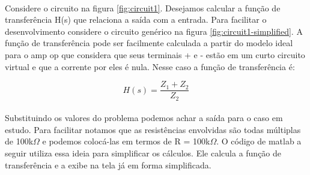 \documentclass[a4paper,11pt]{article}
\begin{document}
\paragraph{}Considere o circuito na figura \ref{fig:circuit1}. 
Desejamos calcular a função de transferência H(s) que relaciona
a saída com a entrada. Para facilitar o desenvolvimento considere
o circuito genérico na figura \ref{fig:circuit1-simplified}. 
A função de transferência pode ser facilmente calculada a partir
do modelo ideal para o amp op que considera que seus terminais
+ e - estão em um curto circuito virtual e que a corrente por 
eles é nula. Nesse caso a função de transferência é:

\begin{equation}
	H(s) = \frac{Z_1 + Z_2}{Z_2}
	\label{eq:exerc1-H}
\end{equation}
\paragraph{}Substituindo os valores do problema podemos achar 
a saída para o caso em estudo. Para facilitar notamos que as 
resistências envolvidas são todas múltiplas de 100k$\Omega$
e podemos colocá-las em termos de R = 100k$\Omega$. O código
de matlab a seguir utiliza essa ideia para simplificar os 
cálculos. Ele calcula a função de transferência e a exibe 
na tela já em forma simplificada.

	
\end{document}

